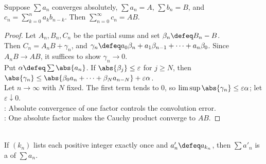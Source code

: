 \begin{theorem} \label{thm:mertens-cauchy-product} \\
Suppose $\sum a_n$ converges absolutely, $\sum a_n=A$, $\sum b_n=B$, and $c_n=\sum\limits_{k=0}^{n}a_kb_{n-k}$. Then $\sum\limits_{n=0}^{\infty}c_n=AB$.
\begin{proof}
Let $A_n,B_n,C_n$ be the partial sums and set $\beta_n\defeq B_n-B$.\\
Then $C_n=A_nB+\gamma_n$, and $\gamma_n\defeq a_0\beta_n+a_1\beta_{n-1}+\cdots+a_n\beta_0$. Since $A_nB\to AB$, it suffices to show $\gamma_n\to0$.\\
Put $\alpha\defeq\sum\abs{a_n}$. If $\abs{\beta_j}\leq\varepsilon$ for $j\geq N$, then $\abs{\gamma_n}\leq \abs{\beta_0a_n+\cdots+\beta_Na_{n-N}}+\varepsilon\alpha$.\\
Let $n\to\infty$ with $N$ fixed. The first term tends to $0$, so $\limsup\abs{\gamma_n}\leq\varepsilon\alpha$; let $\varepsilon\downarrow0$.\\
: Absolute convergence of one factor controls the convolution error.\\
: One absolute factor makes the Cauchy product converge to $AB$.
\end{proof}
\end{theorem}

\begin{definition} \label{def:series-rearrangement} \\
If $(k_n)$ lists each positive integer exactly once and $a'_n\defeq a_{k_n}$, then $\sum a'_n$ is a  of $\sum a_n$.
\end{definition}

